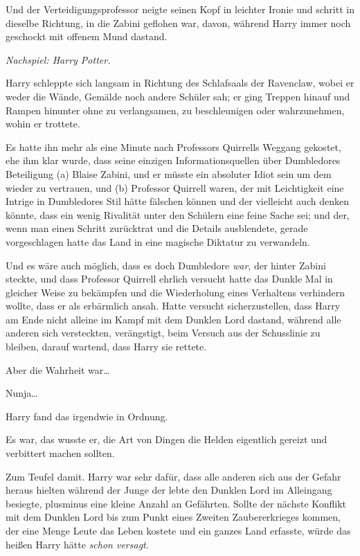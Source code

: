 {Und der Verteidigungsprofessor neigte seinen Kopf in leichter Ironie und schritt in dieselbe Richtung, in die Zabini geflohen war, davon, während Harry immer noch geschockt mit offenem Mund dastand.

\emph{Nachspiel: Harry Potter.}

Harry schleppte sich langsam in Richtung des Schlafsaals der Ravenclaw, wobei er weder die Wände, Gemälde noch andere Schüler sah; er ging Treppen hinauf und Rampen hinunter ohne zu verlangsamen, zu beschleunigen oder wahrzunehmen, wohin er trottete.

Es hatte ihn mehr als eine Minute nach Professors Quirrells Weggang gekostet, ehe ihm klar wurde, dass seine einzigen Informationsquellen über Dumbledores Beteiligung (a) Blaise Zabini, und er müsste ein absoluter Idiot sein um dem wieder zu vertrauen, und (b) Professor Quirrell waren, der mit Leichtigkeit eine Intrige in Dumbledores Stil hätte fälschen können und der vielleicht auch denken könnte, dass ein wenig Rivalität unter den Schülern eine feine Sache sei; und der, wenn man einen Schritt zurücktrat und die Details ausblendete, gerade vorgeschlagen hatte das Land in eine magische Diktatur zu verwandeln.

Und es wäre auch möglich, dass es doch Dumbledore \emph{war}, der hinter Zabini steckte, und dass Professor Quirrell ehrlich versucht hatte das Dunkle Mal in gleicher Weise zu bekämpfen und die Wiederholung eines Verhaltens verhindern wollte, dass er als erbärmlich ansah. Hatte versucht sicherzustellen, dass Harry am Ende nicht alleine im Kampf mit dem Dunklen Lord dastand, während alle anderen sich versteckten, verängstigt, beim Versuch aus der Schusslinie zu bleiben, darauf wartend, dass Harry sie rettete.

Aber die Wahrheit war…

Nunja…

Harry fand das irgendwie in Ordnung.

Es war, das wusste er, die Art von Dingen die Helden eigentlich gereizt und verbittert machen sollten.

Zum Teufel damit. Harry war sehr dafür, dass alle anderen sich aus der Gefahr heraus hielten während der Junge der lebte den Dunklen Lord im Alleingang besiegte, plusminus eine kleine Anzahl an Gefährten. Sollte der nächste Konflikt mit dem Dunklen Lord bis zum Punkt eines Zweiten Zaubererkrieges kommen, der eine Menge Leute das Leben kostete und ein ganzes Land erfasste, würde das heißen Harry hätte \emph{schon versagt}.

}
